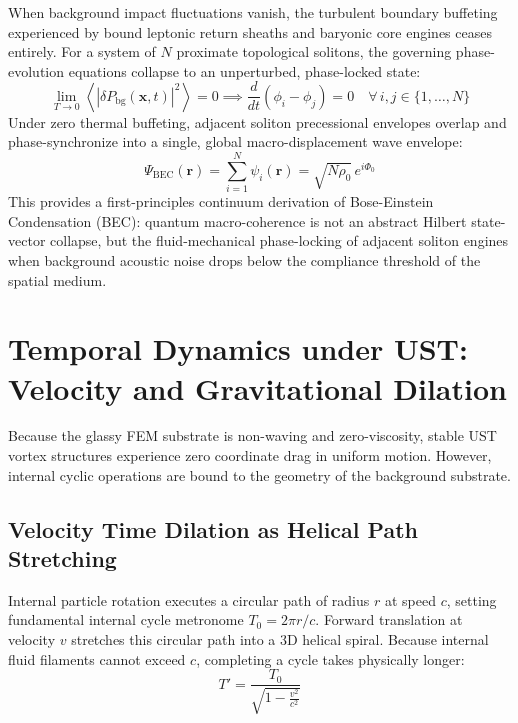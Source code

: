 \documentclass[11pt,a4paper]{article}
\begin{document}
	When background impact fluctuations vanish, the turbulent boundary buffeting experienced by bound leptonic return sheaths and baryonic core engines ceases entirely. For a system of $N$ proximate topological solitons, the governing phase-evolution equations collapse to an unperturbed, phase-locked state:
	\begin{equation}
		\lim_{T \to 0} \left\langle \left| \delta P_{\text{bg}}(\mathbf{x}, t) \right|^2 \right\rangle = 0 \implies \frac{d}{dt} (\phi_i - \phi_j) = 0 \quad \forall \, i, j \in \{1, \dots, N\}
	\end{equation}
	Under zero thermal buffeting, adjacent soliton precessional envelopes overlap and phase-synchronize into a single, global macro-displacement wave envelope:
	\begin{equation}
		\Psi_{\text{BEC}}(\mathbf{r}) = \sum_{i=1}^{N} \psi_i(\mathbf{r}) = \sqrt{N \rho_0} \, e^{i \Phi_0}
	\end{equation}
	This provides a first-principles continuum derivation of Bose-Einstein Condensation (BEC): quantum macro-coherence is not an abstract Hilbert state-vector collapse, but the fluid-mechanical phase-locking of adjacent soliton engines when background acoustic noise drops below the compliance threshold of the spatial medium.
	
	\section{Temporal Dynamics under UST: Velocity and Gravitational Dilation}
	
	Because the glassy FEM substrate is non-waving and zero-viscosity, stable UST vortex structures experience zero coordinate drag in uniform motion. However, internal cyclic operations are bound to the geometry of the background substrate.
	
	\subsection{Velocity Time Dilation as Helical Path Stretching}
	Internal particle rotation executes a circular path of radius $r$ at speed $c$, setting fundamental internal cycle metronome $T_0 = 2\pi r / c$. Forward translation at velocity $v$ stretches this circular path into a 3D helical spiral. Because internal fluid filaments cannot exceed $c$, completing a cycle takes physically longer:
	\begin{equation}
		T' = \frac{T_0}{\sqrt{1 - \frac{v^2}{c^2}}}
	\end{equation}
	
\end{document}
